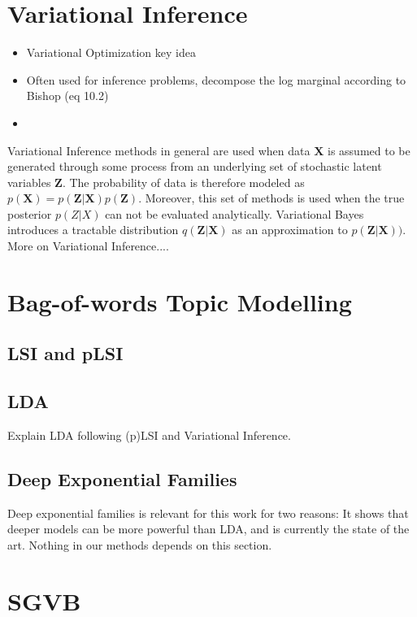 \documentclass{report}
\begin{document}
\section{Variational Inference}
\begin{itemize}
	\item Variational Optimization key idea
	\item Often used for inference problems, decompose the log marginal according to Bishop (eq 10.2)
	\item 
\end{itemize}
Variational Inference methods in general are used when data $\mathbf{X}$ is assumed to be generated through some process from an underlying set of stochastic latent variables $\mathbf{Z}$. The probability of data is therefore modeled as $p(\mathbf{X}) = p(\mathbf{Z}|\mathbf{X})p(\mathbf{Z})$. Moreover, this set of methods is used when the true posterior $p(Z|X)$ can not be evaluated analytically. Variational Bayes introduces a tractable distribution $q(\mathbf{\mathbf{Z}|\mathbf{X}})$ as an approximation to $p(\mathbf{Z}|\mathbf{X}))$.
\\
More on Variational Inference....
\section{Bag-of-words Topic Modelling}

\subsection{LSI and pLSI}
\subsection{LDA}\label{LDA}
Explain LDA following (p)LSI and Variational Inference.
\subsection{Deep Exponential Families}\label{DEF}

Deep exponential families is relevant for this work for two reasons: It shows that deeper models can be more powerful than LDA, and is currently the state of the art. Nothing in our methods depends on this section.


\section{SGVB}\label{sgvb_section}
\end{document}
